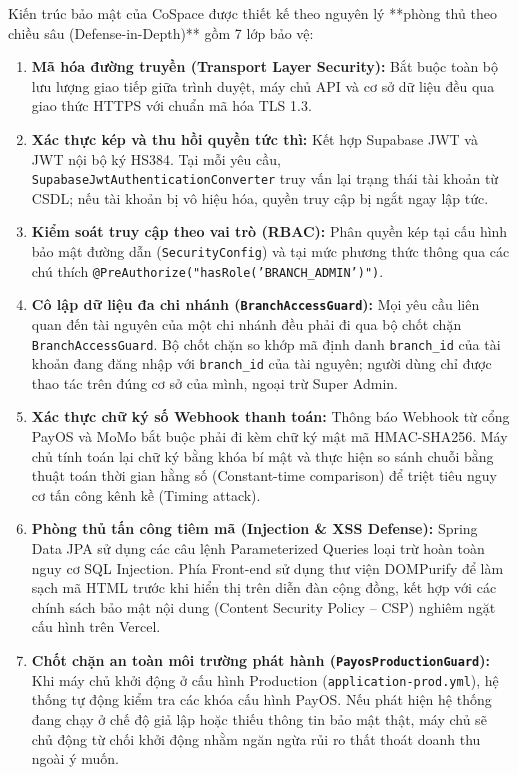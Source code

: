 Kiến trúc bảo mật của CoSpace được thiết kế theo nguyên lý **phòng thủ theo chiều sâu (Defense-in-Depth)** gồm 7 lớp bảo vệ:
\begin{enumerate}
    \item \textbf{Mã hóa đường truyền (Transport Layer Security):} Bắt buộc toàn bộ lưu lượng giao tiếp giữa trình duyệt, máy chủ API và cơ sở dữ liệu đều qua giao thức HTTPS với chuẩn mã hóa TLS 1.3.
    \item \textbf{Xác thực kép và thu hồi quyền tức thì:} Kết hợp Supabase JWT và JWT nội bộ ký HS384. Tại mỗi yêu cầu, \texttt{SupabaseJwtAuthenticationConverter} truy vấn lại trạng thái tài khoản từ CSDL; nếu tài khoản bị vô hiệu hóa, quyền truy cập bị ngắt ngay lập tức.
    \item \textbf{Kiểm soát truy cập theo vai trò (RBAC):} Phân quyền kép tại cấu hình bảo mật đường dẫn (\texttt{SecurityConfig}) và tại mức phương thức thông qua các chú thích \texttt{@PreAuthorize("hasRole('BRANCH\_ADMIN')")}.
    \item \textbf{Cô lập dữ liệu đa chi nhánh (\texttt{BranchAccessGuard}):} Mọi yêu cầu liên quan đến tài nguyên của một chi nhánh đều phải đi qua bộ chốt chặn \texttt{BranchAccessGuard}. Bộ chốt chặn so khớp mã định danh \texttt{branch\_id} của tài khoản đang đăng nhập với \texttt{branch\_id} của tài nguyên; người dùng chỉ được thao tác trên đúng cơ sở của mình, ngoại trừ Super Admin.
    \item \textbf{Xác thực chữ ký số Webhook thanh toán:} Thông báo Webhook từ cổng PayOS và MoMo bắt buộc phải đi kèm chữ ký mật mã HMAC-SHA256. Máy chủ tính toán lại chữ ký bằng khóa bí mật và thực hiện so sánh chuỗi bằng thuật toán thời gian hằng số (Constant-time comparison) để triệt tiêu nguy cơ tấn công kênh kề (Timing attack).
    \item \textbf{Phòng thủ tấn công tiêm mã (Injection \& XSS Defense):} Spring Data JPA sử dụng các câu lệnh Parameterized Queries loại trừ hoàn toàn nguy cơ SQL Injection. Phía Front-end sử dụng thư viện DOMPurify để làm sạch mã HTML trước khi hiển thị trên diễn đàn cộng đồng, kết hợp với các chính sách bảo mật nội dung (Content Security Policy -- CSP) nghiêm ngặt cấu hình trên Vercel.
    \item \textbf{Chốt chặn an toàn môi trường phát hành (\texttt{PayosProductionGuard}):} Khi máy chủ khởi động ở cấu hình Production (\texttt{application-prod.yml}), hệ thống tự động kiểm tra các khóa cấu hình PayOS. Nếu phát hiện hệ thống đang chạy ở chế độ giả lập hoặc thiếu thông tin bảo mật thật, máy chủ sẽ chủ động từ chối khởi động nhằm ngăn ngừa rủi ro thất thoát doanh thu ngoài ý muốn.
\end{enumerate}

